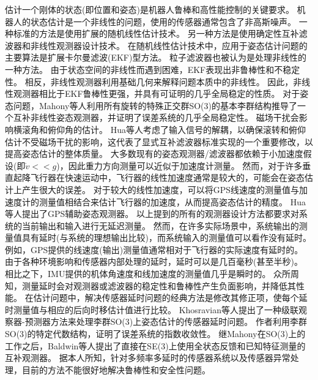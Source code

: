 \documentclass[
  type=master
]{gdutthesis}
\begin{document}
估计一个刚体的状态(即位置和姿态)是机器人鲁棒和高性能控制的关键要求。
机器人的状态估计是一个非线性的问题，使用的传感器通常包含了非高斯噪声\cite{baldwin2009inertial}。
一种标准的方法是使用扩展的随机线性估计技术\cite{lefferts1982kalman,barshan1995inertial}。
另一种方法是使用确定性互补滤波器和非线性观测器设计技术\cite{zimmermann1992high,baerveldt1997low,vik2001nonlinear}。
在随机线性估计技术中，应用于姿态估计问题的主要算法是扩展卡尔曼滤波(EKF)型方法。
粒子滤波器也被认为是处理非线性的一种方法\cite{cheng2004particle}。
由于状态空间的非线性而遇到困难，EKF表现出非鲁棒性和不稳定性\cite{crassidis2007survey}。
相反，非线性观测器利用基础几何来解释问题本质中的非线性。
因此，非线性观测器相比于EKF鲁棒性更强，并具有可证明的几乎全局稳定的性质\cite{thienel2003coupled,mahony2008nonlinear,lageman2009gradient,hua2010attitude,vasconcelos2010nonlinear}。
对于姿态问题，Mahony等人利用所有旋转的特殊正交群SO(3)的基本李群结构推导了一个互补非线性姿态观测器，并证明了误差系统的几乎全局稳定性\cite{mahony2008nonlinear}。
磁场干扰会影响横滚角和俯仰角的估计。
Hua等人考虑了输入信号的解耦，以确保滚转和俯仰估计不受磁场干扰的影响，这代表了显式互补滤波器标准实现的一个重要修改，以提高姿态估计的整体质量\cite{hua2011nonlinear}。
大多数现有的姿态观测器/滤波器都依赖于小加速度假设(即$\dot{v}<<g$)，因此重力方向测量可以近似于加速度计测量。
然而，对于许多垂直起降飞行器在快速运动中，飞行器的线性加速度通常是较大的，可能会在姿态估计上产生很大的误差。
对于较大的线性加速度，可以将GPS线速度的测量值与加速度计的测量值相结合来估计飞行器的加速度，从而提高姿态估计的精度。
Hua等人提出了GPS辅助姿态观测器\cite{hua2010attitude}。
以上提到的所有的观测器设计方法都要求对系统的当前输出和输入进行无延迟测量。
然而，在许多实际场景中，系统输出的测量值具有延时(与系统的理想输出比较)，而系统输入的测量值可以看作没有延时。
例如，GPS提供的线速度(输出)测量值通常相对于飞行器的实际速度有延时的。
由于各种环境影响和传感器内部处理的延时，延时可以是几百毫秒(甚至半秒)\cite{kingston2004real}。
相比之下，IMU提供的机体角速度和线加速度的测量值几乎是瞬时的。
众所周知，测量延时会对观测器或滤波器的稳定性和鲁棒性产生负面影响，并降低其性能\cite{battilotti2015nonlinear}。
在估计问题中，解决传感器延时问题的经典方法是修改其修正项，使每个延时测量值与相应的后向时移估计值进行比较。
Khosravian等人提出了一种级联观察器-预测器方法来处理李群SO(3)上姿态估计的传感器延时问题\cite{khosravian2016state}。
作者利用李群SO(3)的特定代数结构，证明了误差系统的指数收敛性。
继Mahony在SO(3)上的工作之后，Baldwin等人提出了直接在SE(3)上使用全状态反馈和已知特征测量的互补观测器\cite{baldwin2007complementary}。
据本人所知，针对多频率多延时的传感器系统以及传感器异常处理，目前的方法不能很好地解决鲁棒性和安全性问题。
\end{document}

